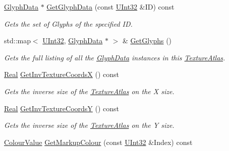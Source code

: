 \begin{DoxyCompactItemize}
\hyperlink{classMezzanine_1_1UI_1_1GlyphData}{GlyphData} $\ast$ \hyperlink{classMezzanine_1_1UI_1_1TextureAtlas_acc882c07f695c0073fc860e345f95d0b}{GetGlyphData} (const \hyperlink{namespaceMezzanine_abea3b8e8e9b03d2547b2800284ba682d}{UInt32} \&ID) const 
\begin{DoxyCompactList}\small\item\em Gets the set of Glyphs of the specified ID. \item\end{DoxyCompactList}\item 
std::map$<$ \hyperlink{namespaceMezzanine_abea3b8e8e9b03d2547b2800284ba682d}{UInt32}, \hyperlink{classMezzanine_1_1UI_1_1GlyphData}{GlyphData} $\ast$ $>$ \& \hyperlink{classMezzanine_1_1UI_1_1TextureAtlas_aef65d1f008b06bc9a26d5f7073a5f206}{GetGlyphs} ()
\begin{DoxyCompactList}\small\item\em Gets the full listing of all the \hyperlink{classMezzanine_1_1UI_1_1GlyphData}{GlyphData} instances in this \hyperlink{classMezzanine_1_1UI_1_1TextureAtlas}{TextureAtlas}. \item\end{DoxyCompactList}\item 
\hyperlink{namespaceMezzanine_a726731b1a7df72bf3583e4a97282c6f6}{Real} \hyperlink{classMezzanine_1_1UI_1_1TextureAtlas_a1dafb7600cd163ac56143ee7b2793a68}{GetInvTextureCoordsX} () const 
\begin{DoxyCompactList}\small\item\em Gets the inverse size of the \hyperlink{classMezzanine_1_1UI_1_1TextureAtlas}{TextureAtlas} on the X size. \item\end{DoxyCompactList}\item 
\hyperlink{namespaceMezzanine_a726731b1a7df72bf3583e4a97282c6f6}{Real} \hyperlink{classMezzanine_1_1UI_1_1TextureAtlas_a79110289a01f30a4ee44a53a07591ba5}{GetInvTextureCoordsY} () const 
\begin{DoxyCompactList}\small\item\em Gets the inverse size of the \hyperlink{classMezzanine_1_1UI_1_1TextureAtlas}{TextureAtlas} on the Y size. \item\end{DoxyCompactList}\item 
\hyperlink{classMezzanine_1_1ColourValue}{ColourValue} \hyperlink{classMezzanine_1_1UI_1_1TextureAtlas_a333f3d7d3d01e44f4b1d4f8062c2e873}{GetMarkupColour} (const \hyperlink{namespaceMezzanine_abea3b8e8e9b03d2547b2800284ba682d}{UInt32} \&Index) const 

\end{DoxyCompactItemize}
